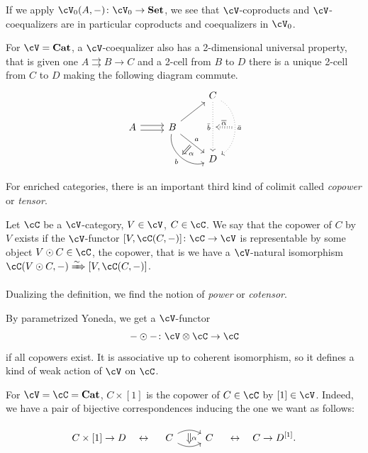 \documentclass[a4paper,11pt,oneside,openany]{scrbook}
\begin{document}
\begin{rmk}
	If we apply $\cV_0(A,-)\colon\cV_0\rightarrow\Set$, we see that $\cV$-coproducts and $\cV$-coequalizers are in particular coproducts and coequalizers in $\cV_0$.
\end{rmk}

\begin{exmp}
	For $\cV=\Cat$, a $\cV$-coequalizer also has a 2-dimensional universal property, that is given one $A\rightrightarrows B\rightarrow C$ and a 2-cell from $B$ to $D$ there is a unique 2-cell from $C$ to $D$ making the following diagram commute.
	\[
		\begin{tikzcd}
			&& C\ar[dd, dotted, swap, "\bar{b}", ""{name=bbar}]\ar[dd, dotted, bend left=60, "\bar{a}", ""{name=abar}] \\
			A\ar[r, shift left,]\ar[r, shift right]
			& B\ar[ur]\ar[dr, "a", ""{name=a}]\ar[dr, bend right=60, swap, "b", ""{name=b}] \\
			&& D
			\ar[Rightarrow, shorten <= .3em, shorten >= .3em, from=a, to=b, "\alpha"]
			\ar[Rightarrow, dotted, shorten <= .3em, shorten >= .3em, swap, from=abar, to=bbar, "\overline{\alpha}"]
		\end{tikzcd}
	\]
\end{exmp}

For enriched categories, there is an important third kind of colimit called \emph{copower} or \emph{tensor}.

\begin{defn}
	Let $\cC$ be a $\cV$-category, $V\in\cV$, $C\in\cC$. We say that the copower of $C$ by $V$ exists if the $\cV$-functor $[V,\cC(C,-)]\colon\cC\rightarrow\cV$ is representable by some object $V\odot C\in\cC$, the copower, that is we have a $\cV$-natural isomorphism $\cC(V\odot C,-)\xRightarrow{\sim}[V,\cC(C,-)]$.

	Dualizing the definition, we find the notion of \emph{power} or \emph{cotensor}.
\end{defn}

\begin{rmk}
	By parametrized Yoneda, we get a $\cV$-functor$$-\odot-\colon\cV\otimes\cC\rightarrow\cC$$if all copowers exist. It is associative up to coherent isomorphism, so it defines a kind of weak action of $\cV$ on $\cC$.
\end{rmk}

\begin{exmp}
	For $\cV=\cC=\Cat$, $C\times[1]$ is the copower of $C\in\cC$ by $[1]\in\cV$. Indeed, we have a pair of bijective correspondences inducing the one we want as follows:

	$$C\times[1]\rightarrow D\quad\leftrightarrow\quad
		\begin{tikzcd}
			C\ar[r, bend left, ""{name=A}]\ar[r, bend right, swap, ""{name=B}]
			& C
			\ar[Rightarrow, shorten <= .3em, shorten >= .3em, from=A, to=B, "\alpha"]
		\end{tikzcd}
		\quad\leftrightarrow\quad C\rightarrow D^{[1]}.$$
\end{exmp}
\end{document}
